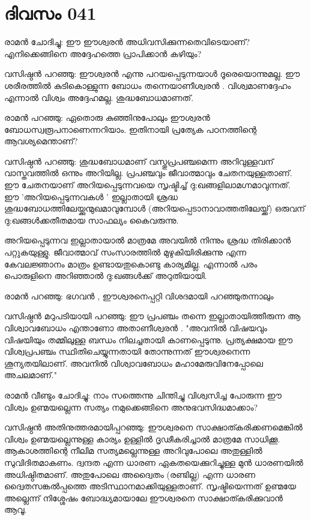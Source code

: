  
\section{ദിവസം 041}


രാമന്‍ ചോദിച്ചു: ഈ ഈശ്വരന്‍ അധിവസിക്കുന്നതെവിടെയാണ്‌? എനിക്കെങ്ങിനെ അദ്ദേഹത്തെ പ്രാപിക്കാന്‍ കഴിയും?

വസിഷ്ഠന്‍ പറഞ്ഞു: ഈശ്വരന്‍ എന്നു പറയപ്പെടുന്നയാള്‍ ദൂരെയൊന്നുമല്ല. ഈ ശരീരത്തില്‍ കുടികൊള്ളുന്ന ബോധം തന്നെയാണീശ്വരന്‍ . വിശ്വമാണദ്ദേഹം എന്നാല്‍ വിശ്വം അദ്ദേഹമല്ല. ശുദ്ധബോധമാണത്‌. 

രാമന്‍ പറഞ്ഞു: ഏതൊരു കുഞ്ഞിനുപോലും ഈശ്വരന്‍ ബോധസ്വരൂപനാണെന്നറിയാം. ഇതിനായി പ്രത്യേക പഠനത്തിന്റെ ആവശ്യമെന്താണ്‌?

വസിഷ്ഠന്‍ പറഞ്ഞു: ശുദ്ധബോധമാണ്‌ വസ്തുപ്രപഞ്ചമെന്ന അറിവുള്ളവന്‌ വാസ്തവത്തില്‍ ഒന്നും അറിയില്ല. പ്രപഞ്ചവും ജീവാത്മാവും ചേതനയുള്ളതാണ്‌. ഈ ചേതനയാണ്‌ അറിയപ്പെടുന്നവയെ സൃഷ്ടിച്ച്‌ ദു:ഖങ്ങളിലാമഗ്നമാവുന്നത്‌. ഈ 'അറിയപ്പെടുന്നവകള്‍ ' ഇല്ലാതായി ശ്രദ്ധ ശുദ്ധബോധത്തിലേയ്ക്കുന്മുഖമാവുമ്പോള്‍ (അറിയപ്പെടാനാവാത്തതിലേയ്ക്ക്‌) ഒരുവന്‌ ദു:ഖങ്ങള്‍ക്കതീതമായ സാഫല്യം കൈവരുന്നു.

അറിയപ്പെടുന്നവ ഇല്ലാതായാല്‍ മാത്രമേ അവയില്‍ നിന്നും ശ്രദ്ധ തിരിക്കാന്‍ പറ്റുകയുള്ളു. ജീവാത്മാവ്‌ സംസാരത്തില്‍ മുഴുകിയിരിക്കുന്നു എന്ന കേവലജ്ഞാനം മാത്രം ഉണ്ടായതുകൊണ്ടു കാര്യമില്ല. എന്നാല്‍ പരം പൊരുളിനെ അറിഞ്ഞാല്‍ ദു:ഖങ്ങള്‍ക്ക്‌ അറുതിയായി. 

രാമന്‍ പറഞ്ഞു: ഭഗവന്‍ , ഈശ്വരനെപ്പറ്റി വിശദമായി പറഞ്ഞുതന്നാലും

വസിഷ്ഠന്‍ മറുപടിയായി പറഞ്ഞു: ഈ പ്രപഞ്ചം തന്നെ ഇല്ലാതായിത്തീരുന്ന ആ വിശ്വാവബോധം എന്താണോ അതാണീശ്വരന്‍ . "അവനില്‍ വിഷയവും വിഷയിയും തമ്മിലുള്ള ബന്ധം നിലച്ചതായി കാണപ്പെടുന്നു. പ്രത്യക്ഷമായ ഈ വിശ്വപ്രപഞ്ചം സ്ഥിതിചെയ്യുന്നതായി തോന്നുന്നത്‌ ഈശ്വരനെന്ന ശൂന്യതയിലാണ്‌. അവനില്‍ വിശ്വാവബോധം മഹാമേരുവിനേപ്പോലെ അചലമാണ്‌."

രാമന്‍ വീണ്ടും ചോദിച്ചു: നാം സത്തെന്നു ചിന്തിച്ചു വിശ്വസിച്ച പോരുന്ന ഈ വിശ്വം ഉണ്മയല്ലെന്ന സത്യം നമുക്കെങ്ങിനെ അനുഭവസിദ്ധമാക്കാം?

വസിഷ്ഠന്‍ അതിനുത്തരമായിപ്പറഞ്ഞു: ഈശ്വരനെ സാക്ഷാത്കരിക്കണമെങ്കില്‍ വിശ്വം ഉണ്മയല്ലെന്നുള്ള കാര്യം ഉള്ളില്‍ ദൃഢീകരിച്ചാല്‍ മാത്രമേ സാധിക്കൂ. ആകാശത്തിന്റെ നീലിമ സത്യമല്ലെന്നുള്ള അറിവുപോലെ അതുള്ളില്‍ സുവിദിതമാകണം. ദ്വന്ദത എന്ന ധാരണ ഏകതയെക്കുറിച്ചുള്ള മുന്‍ ധാരണയില്‍ അധിഷ്ഠിതമാണ്‌. അതുപോലെ അദ്വൈതം (രണ്ടില്ല) എന്ന ധാരണ ദ്വൈതസങ്കല്‍പ്പത്തെ അടിസ്ഥാനമാക്കിയുള്ളതാണ്‌. സൃഷ്ടിയെന്നത്‌ ഉണ്മയേ അല്ലെന്ന് നിശ്ശേഷം ബോദ്ധ്യമായാലേ ഈശ്വരനെ സാക്ഷാത്കരിക്കുവാന്‍ ആവൂ.
